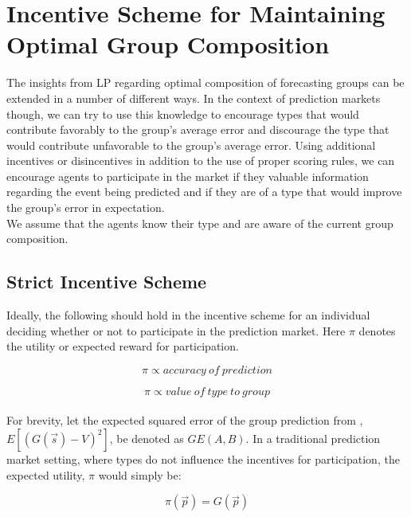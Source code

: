 \documentclass[twoside,twocolumn]{article}
\begin{document}
\section{Incentive Scheme for Maintaining Optimal Group Composition}

The insights from LP \cite{3} regarding optimal composition of forecasting groups can be extended in a number of different ways. In the context of prediction markets though, we can try to use this knowledge to encourage types that would contribute favorably to the group's average error and discourage the type that would contribute unfavorable to the group's average error. Using additional incentives or disincentives in addition to the use of proper scoring rules, we can encourage agents to participate in the market if they valuable information regarding the event being predicted and if they are of a type that would improve the group's error in expectation.\\

We assume that the agents know their type and are aware of the current group composition.

\subsection{Strict Incentive Scheme}

Ideally, the following should hold in the incentive scheme for an individual deciding whether or not to participate in the prediction market. Here $\pi$ denotes the utility or expected reward for participation.

\begin{equation}
\label{proportionalpredict}
\pi \propto accuracy \ of \ prediction
\end{equation}

\begin{equation}
\label{proportionaltype}
\pi \propto value \ of \ type \ to \ group
\end{equation}\\

For brevity, let the expected squared error of the group prediction from \cite{3}, $E[(G(\vec{s}) - V)^2]$, be denoted as $GE(A,B)$. In a traditional prediction market setting, where types do not influence the incentives for participation, the expected utility, $\pi$ would simply be:

\begin{equation}
\label{piorig}
\pi(\vec{p}) = G(\vec{p})
\end{equation}\\
\end{document}
